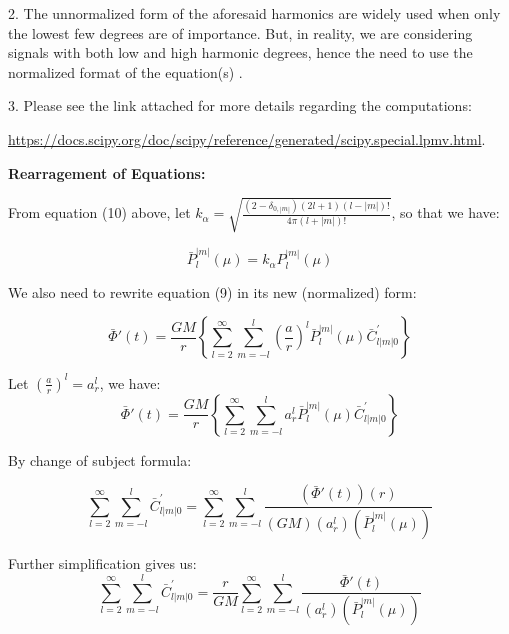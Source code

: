 \documentclass{article}
\begin{document}
2. The unnormalized form of the aforesaid harmonics are widely used when only the lowest few degrees are of importance. But, in reality, we are considering signals with both low and high harmonic degrees, hence the need to use the normalized format of the equation(s) \cite{https://doi.org/10.1029/2018GC007529}. 

3. Please see the link attached for more details regarding the computations: 

\href{https://docs.scipy.org/doc/scipy/reference/generated/scipy.special.lpmv.html}{https://docs.scipy.org/doc/scipy/reference/generated/scipy.special.lpmv.html}.

\vspace{3pt}

\textbf{Rearragement of Equations:}

\vspace{3pt}

From equation (10) above, let $k_{\alpha} = \sqrt{\frac{{(2-\delta_{0,|m|})(2l+1)(l-|m|)!}}{{4\pi (l+|m|)!}}}$, so that we have: 

\begin{equation}
    \bar{P}_{l}^{|m|} (\mu) = k_{\alpha} P^{|m|}_{l} (\mu)
\end{equation}

We also need to rewrite equation (9) in its new (normalized) form: 

\begin{equation}
\bar{\Phi}{'}(t) = \frac{GM}{r}\left\{\sum_{l=2}^{\infty}\sum_{m=-l}^{l}\left(\frac{a}{r}\right)^{l}\bar{P}_{l}^{|m|}(\mu)\bar{C}_{l|m|0}^{'}\right\}
\end{equation}

Let $(\frac{a}{r})^{l} = a_{r}^{l}$, we have: 
\begin{equation}
\bar{\Phi}{'}(t) = \frac{GM}{r}\left\{\sum_{l=2}^{\infty}\sum_{m=-l}^{l}a_{r}^{l}\bar{P}_{l}^{|m|}(\mu)\bar{C}_{l|m|0}^{'}\right\}
\end{equation}

By change of subject formula:

\begin{equation}
\sum_{l=2}^{\infty}\sum_{m=-l}^{l}\bar{C}_{l|m|0}^{'} = \sum_{l=2}^{\infty}\sum_{m=-l}^{l}\frac{(\bar{\Phi}{'}(t))(r)}{(GM)(a_{r}^{l})(\bar{P}_{l}^{|m|}(\mu))}
\end{equation}

Further simplification gives us: 
\begin{equation}
\sum_{l=2}^{\infty}\sum_{m=-l}^{l}\bar{C}_{l|m|0}^{'} =\frac{r}{GM} \sum_{l=2}^{\infty}\sum_{m=-l}^{l}\frac{\bar{\Phi}{'}(t)}{(a_{r}^{l})(\bar{P}_{l}^{|m|}(\mu))}
\end{equation}
\end{document}
